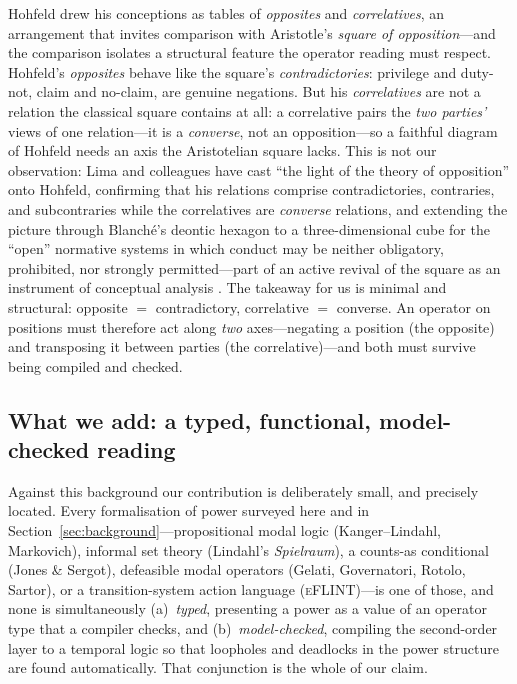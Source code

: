 Hohfeld drew his conceptions as tables of \emph{opposites} and
\emph{correlatives}, an arrangement that invites comparison with Aristotle's
\emph{square of opposition}---and the comparison isolates a structural feature the
operator reading must respect. Hohfeld's \emph{opposites} behave like the square's
\emph{contradictories}: privilege and duty-not, claim and no-claim, are genuine
negations. But his \emph{correlatives} are not a relation the classical square
contains at all: a correlative pairs the \emph{two parties'} views of one
relation---it is a \emph{converse}, not an opposition---so a faithful diagram of
Hohfeld needs an axis the Aristotelian square lacks. This is not our observation:
Lima and colleagues  have cast ``the light of the theory of
opposition'' onto Hohfeld, confirming that his relations comprise contradictories,
contraries, and subcontraries while the correlatives are \emph{converse}
relations, and extending the picture through Blanché's deontic hexagon
 to a three-dimensional cube for the ``open''
normative systems in which conduct may be neither obligatory, prohibited, nor
strongly permitted---part of an active revival of the square as an instrument of
conceptual analysis . The takeaway for us is minimal and
structural: opposite $=$ contradictory, correlative $=$ converse. An operator on
positions must therefore act along \emph{two} axes---negating a position (the
opposite) and transposing it between parties (the correlative)---and both must
survive being compiled and checked.

\subsection{What we add: a typed, functional, model-checked reading}
\label{sec:ho-contribution}

Against this background our contribution is deliberately small, and precisely
located. Every formalisation of power surveyed here and in
Section~\ref{sec:background}---propositional modal logic (Kanger--Lindahl,
Markovich), informal set theory (Lindahl's \emph{Spielraum}), a counts-as
conditional (Jones \& Sergot), defeasible modal operators (Gelati, Governatori,
Rotolo, Sartor), or a transition-system action language (\textsc{eFLINT})---is one
of those, and none is simultaneously (a)~\emph{typed}, presenting a power as a
value of an operator type that a compiler checks, and (b)~\emph{model-checked},
compiling the second-order layer to a temporal logic so that loopholes and
deadlocks in the power structure are found automatically. That conjunction is the
whole of our claim.

